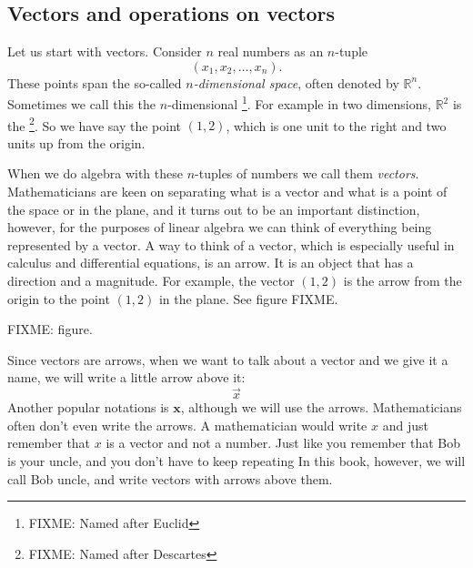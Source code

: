 \subsection{Vectors and operations on vectors}

Let us start with vectors.  Consider $n$ real numbers as an
$n$-tuple
\begin{equation*}
(x_1,x_2,\ldots,x_n). 
\end{equation*}
These points span the so-called
\emph{$n$-dimensional space},
often denoted by ${\mathbb R}^n$.
Sometimes we call this the $n$-dimensional
\emph{}\footnote{FIXME: Named after Euclid}.
For example in two dimensions, ${\mathbb R}^2$ is the
\emph{}\footnote{FIXME: Named after Descartes}.
So we have say
the point $(1,2)$, which is one unit to the right and two units up from the
origin.

When we do algebra with these $n$-tuples of numbers we call them
\emph{vectors}.  Mathematicians are keen on separating
what is a vector and what is a point of the space or in the plane,
and it turns out
to be an important distinction, however, for the purposes of linear algebra
we can think of everything being represented by a vector.
A way to think of a vector, which is especially useful in calculus
and differential equations, is an arrow.  It is an object that has
a direction and a magnitude.  For example, the vector $(1,2)$
is the arrow from the origin to the point $(1,2)$ in the plane.
See figure FIXME.

FIXME: figure.

Since vectors are arrows, when we want to talk about a vector and we give it
a name, we will write a little arrow above it:
\begin{equation*}
\vec{x}
\end{equation*}
Another popular notations is $\mathbf{x}$, although we will use the arrows.
Mathematicians often don't even write the arrows.  A mathematician would
write $x$ and just remember that $x$ is a vector and not a number.
Just like you remember that Bob is your uncle, and you don't have to
keep repeating   In this book, however, we will call Bob
uncle, and write vectors with arrows above them.

